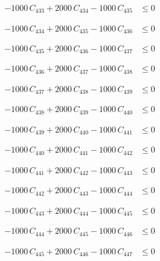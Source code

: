 \documentclass[a4paper,11pt]{article}
\begin{document}
\begin{align}
-1000\,C_{433} + 2000\,C_{434} - 1000\,C_{435} &\leq 0 \nonumber
\end{align}

\begin{align}
-1000\,C_{434} + 2000\,C_{435} - 1000\,C_{436} &\leq 0 \nonumber
\end{align}

\begin{align}
-1000\,C_{435} + 2000\,C_{436} - 1000\,C_{437} &\leq 0 \nonumber
\end{align}

\begin{align}
-1000\,C_{436} + 2000\,C_{437} - 1000\,C_{438} &\leq 0 \nonumber
\end{align}

\begin{align}
-1000\,C_{437} + 2000\,C_{438} - 1000\,C_{439} &\leq 0 \nonumber
\end{align}

\begin{align}
-1000\,C_{438} + 2000\,C_{439} - 1000\,C_{440} &\leq 0 \nonumber
\end{align}

\begin{align}
-1000\,C_{439} + 2000\,C_{440} - 1000\,C_{441} &\leq 0 \nonumber
\end{align}

\begin{align}
-1000\,C_{440} + 2000\,C_{441} - 1000\,C_{442} &\leq 0 \nonumber
\end{align}

\begin{align}
-1000\,C_{441} + 2000\,C_{442} - 1000\,C_{443} &\leq 0 \nonumber
\end{align}

\begin{align}
-1000\,C_{442} + 2000\,C_{443} - 1000\,C_{444} &\leq 0 \nonumber
\end{align}

\begin{align}
-1000\,C_{443} + 2000\,C_{444} - 1000\,C_{445} &\leq 0 \nonumber
\end{align}

\begin{align}
-1000\,C_{444} + 2000\,C_{445} - 1000\,C_{446} &\leq 0 \nonumber
\end{align}

\begin{align}
-1000\,C_{445} + 2000\,C_{446} - 1000\,C_{447} &\leq 0 \nonumber
\end{align}
\end{document}
